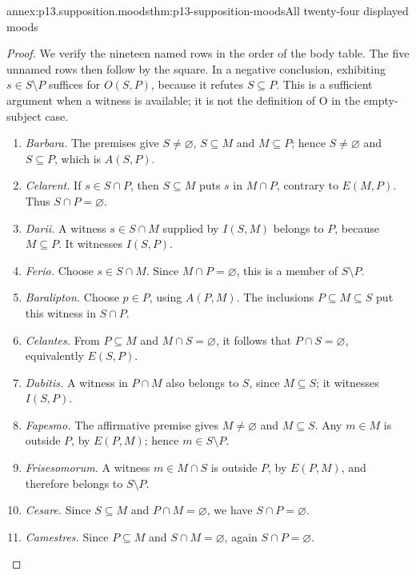 \begin{annexitem}{annex:p13.supposition.moods}{thm:p13-supposition-moods}{All twenty-four displayed moods}
\begin{proof}
We verify the nineteen named rows in the order of the body table. The
five unnamed rows then follow by the square. In a negative conclusion,
exhibiting \(s\in S\setminus P\) suffices for \(O(S,P)\), because it
refutes \(S\subseteq P\). This is a sufficient argument when a witness
is available; it is not the definition of O in the empty-subject case.

\begin{enumerate}[label=\arabic*.]
\item \emph{Barbara.} The premises give \(S\ne\varnothing\),
  \(S\subseteq M\) and \(M\subseteq P\); hence
  \(S\ne\varnothing\) and \(S\subseteq P\), which is \(A(S,P)\).
\item \emph{Celarent.} If \(s\in S\cap P\), then
  \(S\subseteq M\) puts \(s\) in \(M\cap P\), contrary to
  \(E(M,P)\). Thus \(S\cap P=\varnothing\).
\item \emph{Darii.} A witness \(s\in S\cap M\) supplied by
  \(I(S,M)\) belongs to \(P\), because \(M\subseteq P\).
  It witnesses \(I(S,P)\).
\item \emph{Ferio.} Choose \(s\in S\cap M\). Since
  \(M\cap P=\varnothing\), this is a member of \(S\setminus P\).
\item \emph{Baralipton.} Choose \(p\in P\), using \(A(P,M)\).
  The inclusions \(P\subseteq M\subseteq S\) put this witness in
  \(S\cap P\).
\item \emph{Celantes.} From \(P\subseteq M\) and
  \(M\cap S=\varnothing\), it follows that \(P\cap S=\varnothing\),
  equivalently \(E(S,P)\).
\item \emph{Dabitis.} A witness in \(P\cap M\) also belongs to
  \(S\), since \(M\subseteq S\); it witnesses \(I(S,P)\).
\item \emph{Fapesmo.} The affirmative premise gives
  \(M\ne\varnothing\) and \(M\subseteq S\). Any \(m\in M\)
  is outside \(P\), by \(E(P,M)\); hence \(m\in S\setminus P\).
\item \emph{Frisesomorum.} A witness \(m\in M\cap S\) is outside
  \(P\), by \(E(P,M)\), and therefore belongs to \(S\setminus P\).
\item \emph{Cesare.} Since \(S\subseteq M\) and
  \(P\cap M=\varnothing\), we have \(S\cap P=\varnothing\).
\item \emph{Camestres.} Since \(P\subseteq M\) and
  \(S\cap M=\varnothing\), again \(S\cap P=\varnothing\).

\end{enumerate}
\end{proof}
\end{annexitem}
